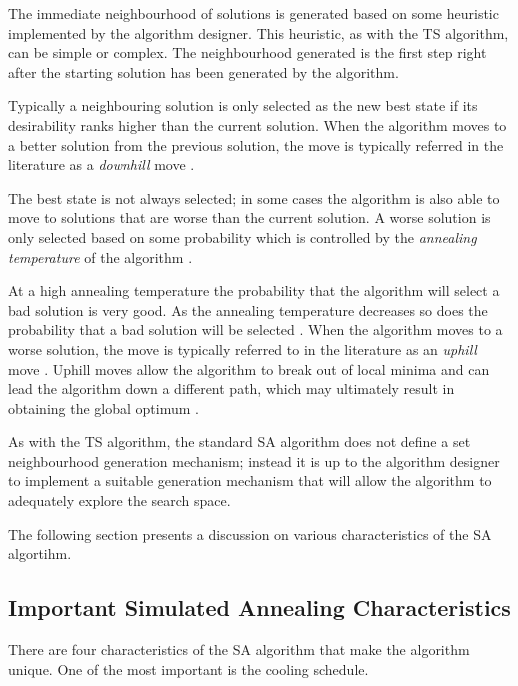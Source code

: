 The immediate neighbourhood of solutions is generated based on some heuristic implemented by the algorithm designer\cite{AIModernApproach}. This heuristic, as with the \gls{TS} algorithm, can be simple or complex. The neighbourhood generated is the first step right after the starting solution has been generated by the algorithm.

Typically a neighbouring solution is only selected as the new best state if its desirability ranks higher than the current solution. When the algorithm moves to a better solution from the previous solution, the move is typically referred in the literature as a \emph{downhill} move \cite{CurveFittingSA}.

The best state is not always selected; in some cases the algorithm is also able to move to solutions that are worse than the current solution. A worse solution is only selected based on some probability which is controlled by the \emph{annealing temperature} of the algorithm \cite{TheoPraticalSA}. 

At a high annealing temperature the probability that the algorithm will select a bad solution is very good. As the annealing temperature decreases so does the probability that a bad solution will be selected \cite{CurveFittingSA}. When the algorithm moves to a worse solution, the move is typically referred to in the literature as an \emph{uphill} move \cite{CurveFittingSA}. Uphill moves allow the algorithm to break out of local minima and can lead the algorithm down a different path, which may ultimately result in obtaining the global optimum \cite{SASingleMultiObj}. 

As with the \gls{TS} algorithm, the standard \gls{SA} algorithm does not define a set neighbourhood generation mechanism; instead it is up to the algorithm designer to implement a suitable generation mechanism that will allow the algorithm to adequately explore the search space\cite{VariousCoolingSA}. 

The following section presents a discussion on various characteristics of the \gls{SA} algortihm.
\subsection{Important Simulated Annealing Characteristics}
There are four characteristics of the \gls{SA} algorithm that make the algorithm unique. One of the most important is the cooling schedule. 


